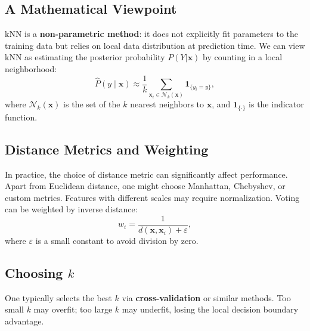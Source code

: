\documentclass[11pt]{article}
\begin{document}
\subsection{A Mathematical Viewpoint}

kNN is a \textbf{non-parametric method}: it does not explicitly fit parameters to the training data but relies on local data distribution at prediction time. We can view kNN as estimating the posterior probability \(P(Y|\mathbf{x})\) by counting in a local neighborhood:
\[
\hat{P}(y \mid \mathbf{x}) 
\approx 
\frac{1}{k}\sum_{\mathbf{x}_i \in \mathcal{N}_k(\mathbf{x})} \mathbf{1}_{\{y_i = y\}},
\]
where \(\mathcal{N}_k(\mathbf{x})\) is the set of the \(k\) nearest neighbors to \(\mathbf{x}\), and \(\mathbf{1}_{\{\cdot\}}\) is the indicator function.

\subsection{Distance Metrics and Weighting}

In practice, the choice of distance metric can significantly affect performance. Apart from Euclidean distance, one might choose Manhattan, Chebyshev, or custom metrics. Features with different scales may require normalization. Voting can be weighted by inverse distance:
\[
w_i = \frac{1}{d(\mathbf{x}, \mathbf{x}_i) + \varepsilon},
\]
where \(\varepsilon\) is a small constant to avoid division by zero.

\subsection{Choosing \(k\)}

One typically selects the best \(k\) via \textbf{cross-validation} or similar methods. Too small \(k\) may overfit; too large \(k\) may underfit, losing the local decision boundary advantage.
\end{document}
